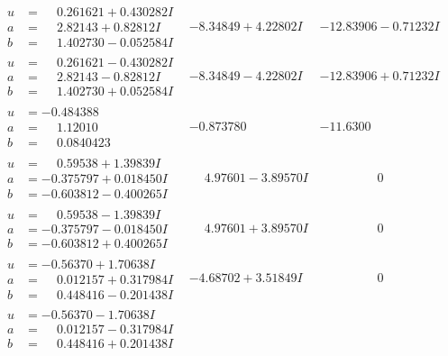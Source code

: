 \documentclass[1p]{elsarticle_modified}
\theoremstyle{definition}
\begin{document}
$$\begin{array}{c|c|c}
\begin{aligned}
u &= \phantom{-}0.261621 + 0.430282 I \\
a &= \phantom{-}2.82143 + 0.82812 I \\
b &= \phantom{-}1.402730 - 0.052584 I\end{aligned}
 & -8.34849 + 4.22802 I & -12.83906 - 0.71232 I \\ \hline\begin{aligned}
u &= \phantom{-}0.261621 - 0.430282 I \\
a &= \phantom{-}2.82143 - 0.82812 I \\
b &= \phantom{-}1.402730 + 0.052584 I\end{aligned}
 & -8.34849 - 4.22802 I & -12.83906 + 0.71232 I \\ \hline\begin{aligned}
u &= -0.484388\phantom{ +0.000000I} \\
a &= \phantom{-}1.12010\phantom{ +0.000000I} \\
b &= \phantom{-}0.0840423\phantom{ +0.000000I}\end{aligned}
 & -0.873780\phantom{ +0.000000I} & -11.6300\phantom{ +0.000000I} \\ \hline\begin{aligned}
u &= \phantom{-}0.59538 + 1.39839 I \\
a &= -0.375797 + 0.018450 I \\
b &= -0.603812 - 0.400265 I\end{aligned}
 & \phantom{-}4.97601 - 3.89570 I & \phantom{-0.000000 } 0 \\ \hline\begin{aligned}
u &= \phantom{-}0.59538 - 1.39839 I \\
a &= -0.375797 - 0.018450 I \\
b &= -0.603812 + 0.400265 I\end{aligned}
 & \phantom{-}4.97601 + 3.89570 I & \phantom{-0.000000 } 0 \\ \hline\begin{aligned}
u &= -0.56370 + 1.70638 I \\
a &= \phantom{-}0.012157 + 0.317984 I \\
b &= \phantom{-}0.448416 - 0.201438 I\end{aligned}
 & -4.68702 + 3.51849 I & \phantom{-0.000000 } 0 \\ \hline\begin{aligned}
u &= -0.56370 - 1.70638 I \\
a &= \phantom{-}0.012157 - 0.317984 I \\
b &= \phantom{-}0.448416 + 0.201438 I\end{aligned}

\end{array}$$
\end{document}
